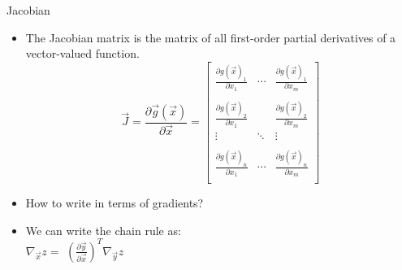 \begin{vbframe}{Jacobian}

\vfill

\begin{itemize}
\item The Jacobian matrix is the matrix of all first-order partial derivatives of a vector-valued function. 
\[\vec J = \frac{\partial \vec g(\vec x)}{\partial \vec x} =
\begin{bmatrix}
    \frac{\partial g(\vec x)_1}{\partial x_1} & \cdots & \frac{\partial g(\vec x)_1}{\partial x_m} \\
    & & \\
    \frac{\partial g(\vec x)_2}{\partial x_1} & & \frac{\partial g(\vec x)_2}{\partial x_m}\\
    \vdots & \ddots & \vdots \\
    & &  \\
    \frac{\partial g(\vec x)_n}{\partial x_1}& \cdots &  \frac{\partial g(\vec x)_n}{\partial x_m} \\
\end{bmatrix} 
\]
\item How to write in terms of gradients?

\item We can write the chain rule as:\\
\vspace{.2cm}
$\displaystyle{\nabla_{\vec x} z = }$ \pause $\displaystyle{\left(\frac{\partial \vec y}{\partial \vec x}\right)^T \nabla_{\vec y} z}$

\end{itemize}
\begin{center}
\end{center}

\vfill

\end{vbframe}



